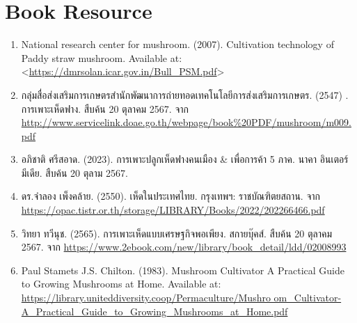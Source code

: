 \section{Book Resource}
\begin{enumerate}
  \item National research center for mushroom. (2007). Cultivation technology of Paddy straw mushroom. Available at: <\url{https://dmrsolan.icar.gov.in/Bull\_PSM.pdf}>
  \item {\T กลุ่มสื่อส่งเสริมการเกษตรสำนักพัฒนาการถ่ายทอดเทคโนโลยีการส่งเสริมการเกษตร}. (2547) . {\T การเพาะเห็ดฟาง. สืบค้น} 20 {\T ตุลาคม} 2567. {\T จาก} \url{http://www.servicelink.doae.go.th/webpage/book\%20PDF/mushroom/m009.pdf}
  \item {\T อภิชาติ ศรีสอาด}.  (2023). {\T การเพาะปลูกเห็ดฟางคนเมือง} \& {\T เพื่อการค้า} 5 {\T ภาค}. {\T นาคา อินเตอร์มีเดีย}. {\T สืบค้น} 20 {\T ตุลาม} 2567.
  \item {\T ดร.จำลอง เพ็งคล้าย}. (2550). {\T เห็ดในประเทศไทย. กรุงเทพฯ: ราชบัณฑิตยสถาน. จาก} \url{https://opac.tistr.or.th/storage/LIBRARY/Books/2022/202266466.pdf}
  \item {\T วิทยา ทวีนุช}. (2565). {\T การเพาะเห็ดแบบเศรษฐกิจพอเพียง. สกายบุ๊คส์. สืบค้น} 20 {\T ตุลาคม} 2567. จาก \url{https://www.2ebook.com/new/library/book\_detail/ldd/02008993}
  \item Paul Stamets J.S. Chilton. (1983). Mushroom Cultivator A Practical Guide to Growing Mushrooms at Home. Available at: \url{https://library.uniteddiversity.coop/Permaculture/Mushro om\_Cultivator-A\_Practical\_Guide\_to\_Growing\_Mushrooms\_at\_Home.pdf}
\end{enumerate}
